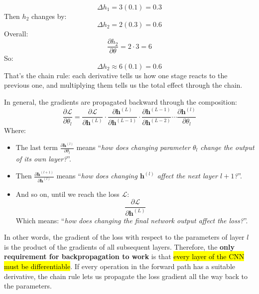 \begin{examplebox}
    \begin{equation*}
        \Delta h_1=3(0.1)=0.3
    \end{equation*}
    Then $h_2$ changes by:
    \begin{equation*}
        \Delta h_2=2(0.3)=0.6
    \end{equation*}
    Overall:
    \begin{equation*}
        \frac{\partial h_2}{\partial\theta}
        =
        2\cdot3
        =
        6
    \end{equation*}
    So:
    \begin{equation*}
        \Delta h_2\approx6(0.1)=0.6
    \end{equation*}
    That's the chain rule: each derivative tells us how one stage reacts to the previous one, and multiplying them tells us the total effect through the chain.
\end{examplebox}

\highspace
In general, the gradients are propagated backward through the composition:
\begin{equation*}
    \frac{\partial\mathcal{L}}{\partial\theta_l}
    =
    \frac{\partial\mathcal{L}}{\partial\mathbf{h}^{(L)}} \cdot
    \frac{\partial\mathbf{h}^{(L)}}{\partial\mathbf{h}^{(L-1)}} \cdot
    \frac{\partial\mathbf{h}^{(L-1)}}{\partial\mathbf{h}^{(L-2)}}
    \cdots
    \frac{\partial\mathbf{h}^{(l)}}{\partial\theta_l}
\end{equation*}
Where:
\begin{itemize}
    \item The last term $\frac{\partial\mathbf{h}^{(l)}}{\partial\theta_l}$ means ``\emph{how does changing parameter $\theta_{l}$ change the output of its own layer?}''.
    \item Then $\frac{\partial\mathbf{h}^{(l+1)}}{\partial\mathbf{h}^{(l)}}$ means ``\emph{how does changing $\mathbf{h}^{(l)}$ affect the next layer $l+1$?}''.
    \item And so on, until we reach the loss $\mathcal{L}$:
        \begin{equation*}
            \frac{\partial\mathcal{L}}{\partial\mathbf{h}^{(L)}}
        \end{equation*}
        Which means: ``\emph{how does changing the final network output affect the loss?}''.
\end{itemize}
In other words, the gradient of the loss with respect to the parameters of layer $l$ is the product of the gradients of all subsequent layers. Therefore, the \textbf{only requirement for backpropagation to work} is that \hl{every layer of the CNN must be differentiable}. If every operation in the forward path has a suitable derivative, the chain rule lets us propagate the loss gradient all the way back to the parameters.

